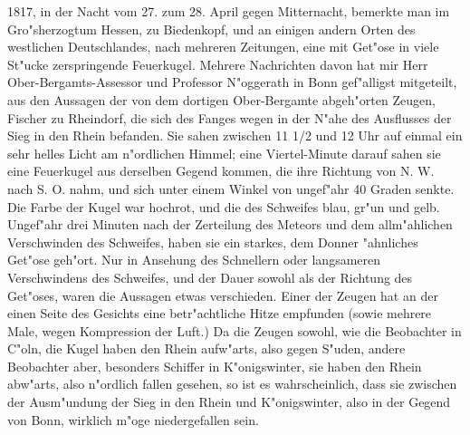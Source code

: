 \documentclass[a4paper, 11pt, oneside, polutonikogreek, german]{article}
\begin{document}
1817, in der Nacht vom 27. zum 28. April gegen Mitternacht, bemerkte man im Gro"sherzogtum Hessen, zu Biedenkopf, und an einigen andern Orten des westlichen Deutschlandes, nach mehreren Zeitungen, eine mit Get"ose in viele St"ucke zerspringende Feuerkugel. Mehrere Nachrichten davon hat mir Herr Ober-Bergamts-Assessor und Professor N"oggerath in Bonn gef"alligst mitgeteilt, aus den Aussagen der von dem dortigen Ober-Bergamte abgeh"orten Zeugen, Fischer zu Rheindorf, die sich des Fanges wegen in der N"ahe des Ausflusses der Sieg in den Rhein befanden. Sie sahen zwischen 11 1/2 und 12 Uhr auf einmal ein sehr helles Licht am n"ordlichen Himmel; eine Viertel-Minute darauf sahen sie eine Feuerkugel aus derselben Gegend kommen, die ihre Richtung von N. W. nach S. O. nahm, und sich unter einem Winkel von ungef"ahr 40 Graden senkte. Die Farbe der Kugel war hochrot, und die des Schweifes blau, gr"un und gelb. Ungef"ahr drei Minuten nach der Zerteilung des Meteors und dem allm"ahlichen Verschwinden des Schweifes, haben sie ein starkes, dem Donner "ahnliches Get"ose geh"ort. Nur in Ansehung des Schnellern oder langsameren Verschwindens des Schweifes, und der Dauer sowohl als der Richtung des Get"oses, waren die Aussagen etwas verschieden. Einer der Zeugen hat an der einen Seite des Gesichts eine betr"achtliche Hitze empfunden (sowie mehrere Male, wegen Kompression der Luft.) Da die Zeugen sowohl, wie die Beobachter in C"oln, die Kugel haben den Rhein aufw"arts, also gegen S"uden, andere Beobachter aber, besonders Schiffer in K"onigswinter, sie haben den Rhein abw"arts, also n"ordlich fallen gesehen, so ist es wahrscheinlich, dass sie zwischen der Ausm"undung der Sieg in den Rhein und K"onigswinter, also in der Gegend von Bonn, wirklich m"oge niedergefallen sein.
\end{document}
